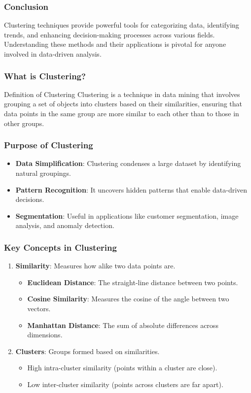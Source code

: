 \documentclass{beamer}
\begin{document}
\begin{frame}
    \frametitle{Conclusion}
    Clustering techniques provide powerful tools for categorizing data, identifying trends, and enhancing decision-making processes across various fields. Understanding these methods and their applications is pivotal for anyone involved in data-driven analysis.
\end{frame}

\begin{frame}[fragile]
    \frametitle{What is Clustering?}
    \begin{block}{Definition of Clustering}
        Clustering is a technique in data mining that involves grouping a set of objects into clusters based on their similarities, ensuring that data points in the same group are more similar to each other than to those in other groups.
    \end{block}
\end{frame}

\begin{frame}[fragile]
    \frametitle{Purpose of Clustering}
    \begin{itemize}
        \item \textbf{Data Simplification}: Clustering condenses a large dataset by identifying natural groupings.
        \item \textbf{Pattern Recognition}: It uncovers hidden patterns that enable data-driven decisions.
        \item \textbf{Segmentation}: Useful in applications like customer segmentation, image analysis, and anomaly detection.
    \end{itemize}
\end{frame}

\begin{frame}[fragile]
    \frametitle{Key Concepts in Clustering}
    \begin{enumerate}
        \item \textbf{Similarity}: Measures how alike two data points are.
            \begin{itemize}
                \item \textbf{Euclidean Distance}: The straight-line distance between two points.
                \item \textbf{Cosine Similarity}: Measures the cosine of the angle between two vectors.
                \item \textbf{Manhattan Distance}: The sum of absolute differences across dimensions.
            \end{itemize}
        
        \item \textbf{Clusters}: Groups formed based on similarities.
            \begin{itemize}
                \item High intra-cluster similarity (points within a cluster are close).
                \item Low inter-cluster similarity (points across clusters are far apart).
            \end{itemize}
    \end{enumerate}
\end{frame}
\end{document}
